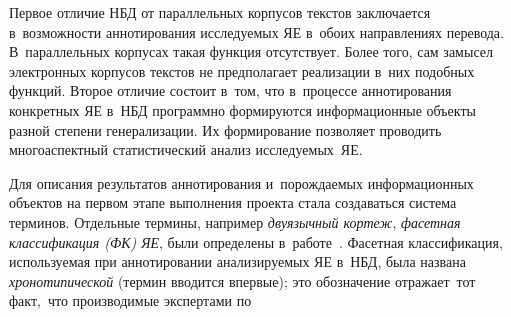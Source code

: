 \begin{multicols}{2}
    Первое отличие НБД от параллельных корпусов текстов заключается 
в~возможности аннотирования исследуемых ЯЕ в~обоих 
направлениях перевода. В~параллельных корпусах такая функция отсутствует. 
Более того, сам замысел электронных корпусов текстов не предполагает 
реализации  в~них подобных функций. Второе отличие состоит в~том, что 
в~процессе аннотирования конкретных ЯЕ в~НБД программно 
формируются информационные объекты разной степени генерализации. Их 
формирование позволяет проводить многоаспектный статистический анализ 
ис\-сле\-ду\-емых~ЯЕ.
    
    Для описания результатов аннотирования и~порождаемых 
информационных объектов на первом этапе выполнения проекта стала 
создаваться сис\-тема терминов. Отдельные термины, например 
\textit{двуязычный кортеж}, \textit{фасетная классификация
(ФК) ЯЕ}, были определены в~работе~\cite{10-zat}. Фасетная классификация, 
используемая при аннотировании анализируемых ЯЕ
в~НБД, была названа \textit{хронотипической} (термин вводится впервые); это 
обозначение отражает\, тот\, факт,\, что производимые экспертами по\linebreak\vspace*{-36pt}



\end{multicols}



